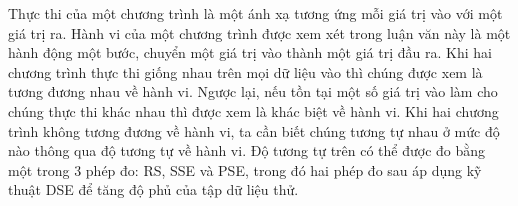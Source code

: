 Thực thi của một chương trình là một ánh xạ tương ứng mỗi giá trị vào
với một giá trị ra. Hành vi của một chương trình được xem xét trong
luận văn này là một hành động một bước, chuyển một giá trị vào thành
một giá trị đầu ra. Khi hai chương trình thực thi giống nhau trên mọi
dữ liệu vào thì chúng được xem là tương đương nhau về hành vi. Ngược
lại, nếu tồn tại một số giá trị vào làm cho chúng thực thi khác nhau
thì được xem là khác biệt về hành vi. Khi hai chương trình không tương
đương về hành vi, ta cần biết chúng tương tự nhau ở mức độ nào thông
qua độ tương tự về hành vi. Độ tương tự trên có thể được đo bằng một
trong $3$ phép đo: RS, SSE và PSE, trong đó hai phép đo sau áp dụng kỹ
thuật DSE để tăng độ phủ của tập dữ liệu thử.

  
